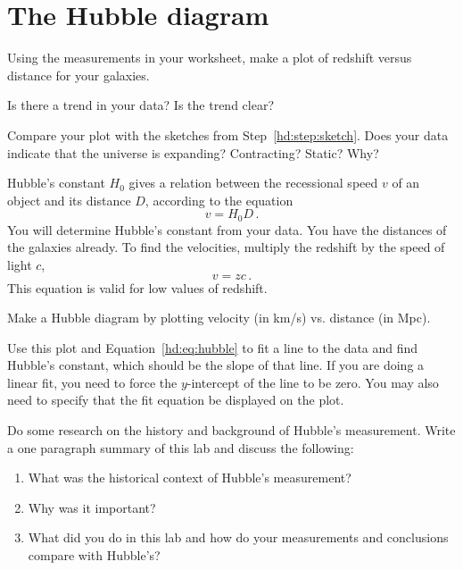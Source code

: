 \section{The Hubble diagram}

\begin{steps}
	
	\item Using the measurements in your worksheet, make a plot of redshift
	versus distance for your galaxies.
	
	\item Is there a trend in your data? Is the trend clear?
	
	\item Compare your plot with the sketches from Step~\ref{hd:step:sketch}. Does your data
	indicate that the universe is expanding? Contracting? Static? Why?

\end{steps}

Hubble's constant $H_0$ gives a relation between the recessional speed $v$ of an object and its distance $D$, according to the equation
\begin{equation}\label{hd:eq:hubble}
 v = H_0 D \,.
\end{equation}
You will determine Hubble's constant from your data. You have the distances of the galaxies already. To find the velocities, multiply the redshift by the speed of light $c$,
\begin{equation}
 v = zc \,.
\end{equation}
This equation is valid for low values of redshift.

\begin{steps}
	
	\item Make a Hubble diagram by plotting velocity (in km/s) vs. distance (in Mpc).
	
	\item Use this plot and Equation~\ref{hd:eq:hubble} to fit a line to the data and find Hubble's constant, which should be the slope of that line. If you are doing a linear fit, you need to force the $y$-intercept of the line to be zero. You may also need to specify that the fit equation be displayed on the plot.
	
	\item Do some research on the history and background of Hubble’s
	measurement. Write a one paragraph summary of this lab and discuss
	the following:
	\begin{enumerate}
		\item What was the historical context of Hubble’s measurement?
		\item Why was it important?
		\item What did you do in this lab and how do your measurements and
		conclusions compare with Hubble’s?
	\end{enumerate}
\end{steps}

